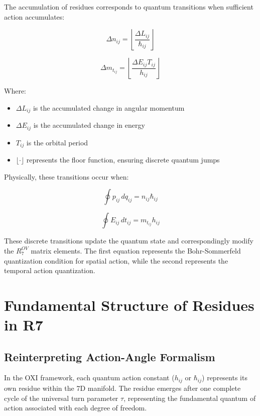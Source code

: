 \documentclass{article}
\begin{document}
The accumulation of residues corresponds to quantum transitions when sufficient action accumulates:

\begin{equation}
\Delta n_{ij} = \left\lfloor \frac{\Delta L_{ij}}{\hbar_{ij}} \right\rfloor
\end{equation}

\begin{equation}
\Delta m_{t_{ij}} = \left\lfloor \frac{\Delta E_{ij}T_{ij}}{h_{ij}} \right\rfloor
\end{equation}

Where:
\begin{itemize}
\item $\Delta L_{ij}$ is the accumulated change in angular momentum
\item $\Delta E_{ij}$ is the accumulated change in energy
\item $T_{ij}$ is the orbital period
\item $\lfloor \cdot \rfloor$ represents the floor function, ensuring discrete quantum jumps
\end{itemize}

Physically, these transitions occur when:

\begin{equation}
\oint p_{ij} \, dq_{ij} = n_{ij} \hbar_{ij}
\end{equation}

\begin{equation}
\oint E_{ij} \, dt_{ij} = m_{t_{ij}} h_{ij}
\end{equation}

These discrete transitions update the quantum state and correspondingly modify the $R^{OV}_7$ matrix elements. The first equation represents the Bohr-Sommerfeld quantization condition for spatial action, while the second represents the temporal action quantization.

\section{Fundamental Structure of Residues in R7}

\subsection{Reinterpreting Action-Angle Formalism}

In the OXI framework, each quantum action constant ($h_{ij}$ or $\hbar_{ij}$) represents its own residue within the 7D manifold. The residue emerges after one complete cycle of the universal turn parameter $\tau$, representing the fundamental quantum of action associated with each degree of freedom.
\end{document}
